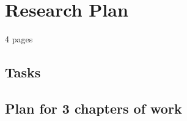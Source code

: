 \chapter{Research Plan}
\label{cha:plan}

4 pages

\section{Tasks}

\section{Plan for 3 chapters of work}
